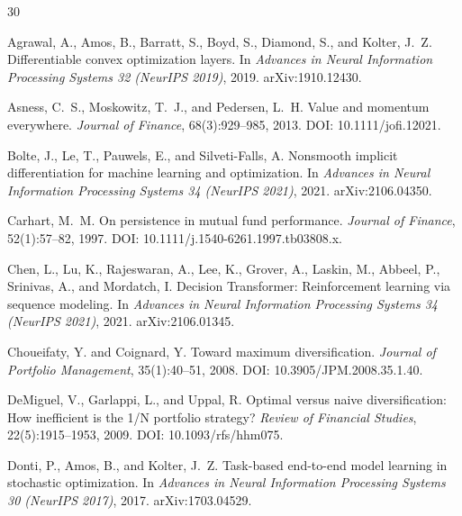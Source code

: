 \begin{thebibliography}{30}

Agrawal, A., Amos, B., Barratt, S., Boyd, S., Diamond, S., and Kolter, J.~Z.
\newblock Differentiable convex optimization layers.
\newblock In \emph{Advances in Neural Information Processing Systems 32 (NeurIPS 2019)}, 2019. arXiv:1910.12430.

Asness, C.~S., Moskowitz, T.~J., and Pedersen, L.~H.
\newblock Value and momentum everywhere.
\newblock \emph{Journal of Finance}, 68(3):929--985, 2013.
\newblock DOI: 10.1111/jofi.12021.

Bolte, J., Le, T., Pauwels, E., and Silveti-Falls, A.
\newblock Nonsmooth implicit differentiation for machine learning and optimization.
\newblock In \emph{Advances in Neural Information Processing Systems 34 (NeurIPS 2021)}, 2021. arXiv:2106.04350.

Carhart, M.~M.
\newblock On persistence in mutual fund performance.
\newblock \emph{Journal of Finance}, 52(1):57--82, 1997.
\newblock DOI: 10.1111/j.1540-6261.1997.tb03808.x.

Chen, L., Lu, K., Rajeswaran, A., Lee, K., Grover, A., Laskin, M., Abbeel, P., Srinivas, A., and Mordatch, I.
\newblock Decision Transformer: Reinforcement learning via sequence modeling.
\newblock In \emph{Advances in Neural Information Processing Systems 34 (NeurIPS 2021)}, 2021. arXiv:2106.01345.

Choueifaty, Y. and Coignard, Y.
\newblock Toward maximum diversification.
\newblock \emph{Journal of Portfolio Management}, 35(1):40--51, 2008.
\newblock DOI: 10.3905/JPM.2008.35.1.40.

DeMiguel, V., Garlappi, L., and Uppal, R.
\newblock Optimal versus naive diversification: How inefficient is the 1/N portfolio strategy?
\newblock \emph{Review of Financial Studies}, 22(5):1915--1953, 2009.
\newblock DOI: 10.1093/rfs/hhm075.

Donti, P., Amos, B., and Kolter, J.~Z.
\newblock Task-based end-to-end model learning in stochastic optimization.
\newblock In \emph{Advances in Neural Information Processing Systems 30 (NeurIPS 2017)}, 2017. arXiv:1703.04529.


\end{thebibliography}
